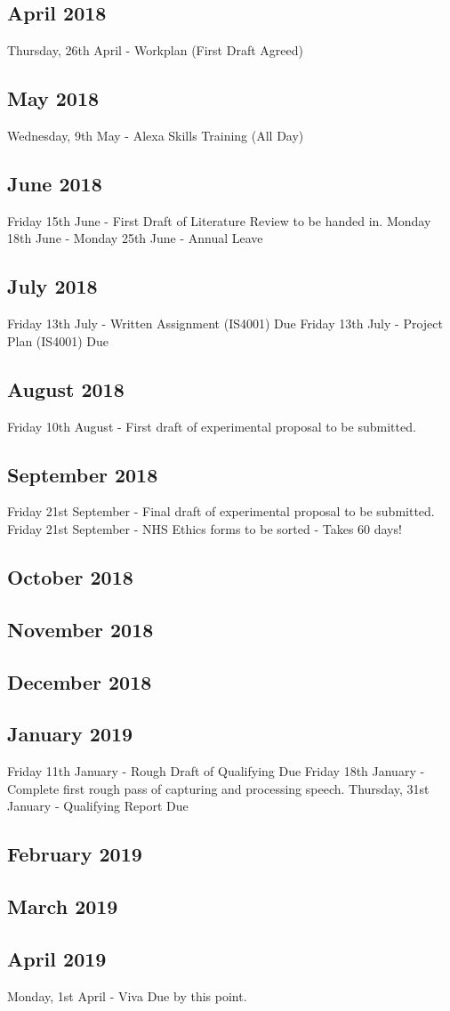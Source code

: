 \documentclass{article}
\begin{document}
	\subsection{April 2018}
	Thursday, 26th April - Workplan (First Draft Agreed)
	\subsection{May 2018}
	Wednesday, 9th May - Alexa Skills Training (All Day)
	\subsection{June 2018}
	Friday 15th June - First Draft of Literature Review to be handed in.
	\newline
	Monday 18th June - Monday 25th June - Annual Leave
	\subsection{July 2018}
	Friday 13th July - Written Assignment (IS4001) Due
	Friday 13th July - Project Plan (IS4001) Due
	
	\subsection{August 2018}
	Friday 10th August - First draft of experimental proposal to be submitted.
	
	
	\subsection{September 2018}
	Friday 21st September - Final draft of experimental proposal to be submitted. 
	Friday 21st September - NHS Ethics forms to be sorted  - Takes 60 days!
	\subsection{October 2018}

	\subsection{November 2018}
	
	\subsection{December 2018}	
	
	\subsection{January 2019}
	Friday 11th January - Rough Draft of Qualifying Due
	Friday 18th January - Complete first rough pass of capturing and processing speech.
	Thursday, 31st January - Qualifying Report Due
	
	\subsection{February 2019}

	
	\subsection{March 2019}
	
	\subsection{April 2019}
	Monday, 1st April - Viva Due by this point.
\end{document}

